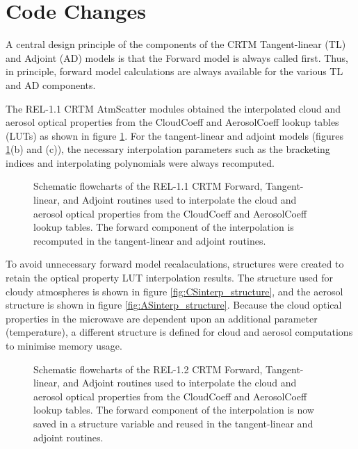 \section{Code Changes}
A central design principle of the components of the CRTM Tangent-linear (TL) and Adjoint (AD) models is that the Forward model is always called first. Thus, in principle, forward model calculations are always available for the various TL and AD components.

The REL-1.1 CRTM AtmScatter modules obtained the interpolated cloud and aerosol optical properties from the CloudCoeff and AerosolCoeff lookup tables (LUTs) as shown in figure \ref{fig:AtmScatter_Interpolation}. For the tangent-linear and adjoint models (figures \ref{fig:AtmScatter_Interpolation}(b) and (c)), the necessary interpolation parameters such as the bracketing indices and interpolating polynomials were always recomputed. 
\begin{figure}[htp]
  \centering
  
  \caption{Schematic flowcharts of the REL-1.1 CRTM Forward, Tangent-linear, and Adjoint routines used to interpolate the cloud and aerosol optical properties from the CloudCoeff and AerosolCoeff lookup tables. The forward component of the interpolation is recomputed in the tangent-linear and adjoint routines.}
  \label{fig:AtmScatter_Interpolation}
\end{figure}

To avoid unnecessary forward model recalaculations, structures were created to retain the optical property LUT interpolation results. The structure used for cloudy atmospheres is shown in figure \ref{fig:CSinterp_structure}, and the aerosol structure is shown in figure \ref{fig:ASinterp_structure}. Because the cloud optical properties in the microwave are dependent upon an additional parameter (temperature), a different structure is defined for cloud and aerosol computations to minimise memory usage.

\begin{figure}[htp]
  \centering
  
  \caption{Schematic flowcharts of the REL-1.2 CRTM Forward, Tangent-linear, and Adjoint routines used to interpolate the cloud and aerosol optical properties from the CloudCoeff and AerosolCoeff lookup tables. The forward component of the interpolation is now saved in a structure variable and reused in the tangent-linear and adjoint routines.}
  \label{fig:AtmScatter_Interpolation.new}
\end{figure}

